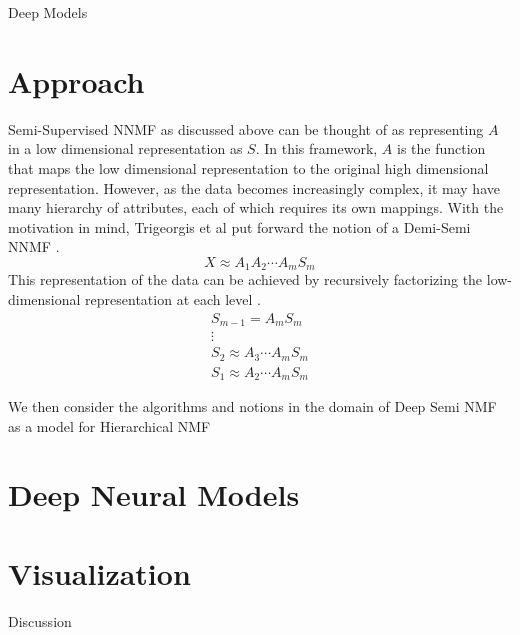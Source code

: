 \documentclass[12pt]{pom_thesis}
\begin{document}
\begin{chapter}{Deep Models}
\section{Approach}
Semi-Supervised NNMF as discussed above can be thought of as representing $A$ in a low dimensional representation as $S$. In this framework, $A$ is the function that maps the low dimensional representation to the original high dimensional representation. However, as the data becomes increasingly complex, it may have many hierarchy of attributes, each of which requires its own mappings. With the motivation in mind, Trigeorgis et al put forward the notion of a Demi-Semi NNMF \cite{trigeorgis2014deep}.
$$X \approx A_1A_2 \cdots A_m S_m$$
This representation of the data can be achieved by recursively factorizing the low-dimensional representation at each level \cite{trigeorgis2014deep}.
\begin{align*}
S_{m-1} = A_mS_m\\
\vdots \\
S_2  \approx A_3 \cdots A_m  S_m\\
S_1  \approx A_2 \cdots A_m  S_m
\end{align*}

We then consider the algorithms and notions in the domain of Deep Semi NMF as a model for Hierarchical NMF \cite{ deepNonNeg, trigeorgis2014deep} 
\section{Deep Neural Models}
\section{Visualization}
	\end{chapter}
\begin{chapter}{Discussion}
	\end{chapter}





\end{document}
